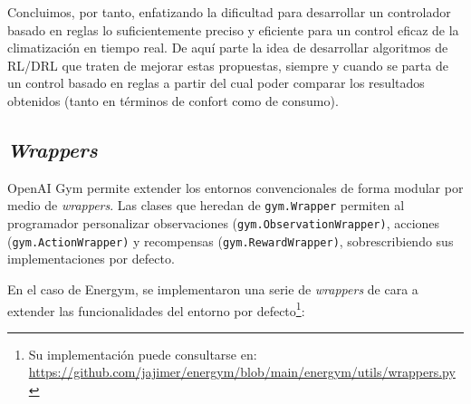Concluimos, por tanto, enfatizando la dificultad para desarrollar un controlador basado en reglas lo suficientemente preciso y eficiente para un control eficaz de la climatización en tiempo real. De aquí parte la idea de desarrollar algoritmos de RL/DRL que traten de mejorar estas propuestas, siempre y cuando se parta de un control basado en reglas a partir del cual poder comparar los resultados obtenidos (tanto en términos de confort como de consumo).

\subsection{\textit{Wrappers}}

OpenAI Gym permite extender los entornos convencionales de forma modular por medio de \textit{wrappers}. Las clases que heredan de \texttt{gym.Wrapper} permiten al programador personalizar observaciones (\texttt{gym.ObservationWrapper)}, acciones (\texttt{gym.ActionWrapper)} y recompensas (\texttt{gym.RewardWrapper)}, sobrescribiendo sus implementaciones por defecto.

En el caso de Energym, se implementaron una serie de \textit{wrappers} de cara a extender las funcionalidades del entorno por defecto\footnote{Su implementación puede consultarse en: \url{https://github.com/jajimer/energym/blob/main/energym/utils/wrappers.py}}:

